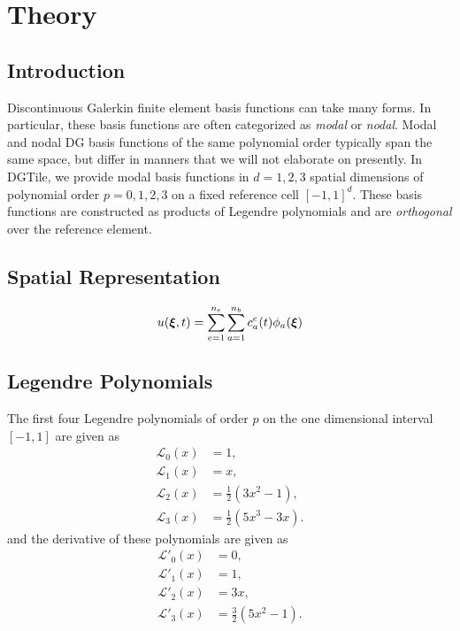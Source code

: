 \section{Theory}

\subsection{Introduction}

Discontinuous Galerkin finite element basis functions can take many forms.
In particular, these basis functions are often categorized as \emph{modal}
or \emph{nodal}. Modal and nodal DG basis functions of the same polynomial
order typically span the same space, but differ in manners that we will not
elaborate on presently. In DGTile, we provide modal basis functions in
$d=1,2,3$ spatial dimensions of polynomial order $p=0,1,2,3$ on a fixed
reference cell $[-1,1]^d$. These basis functions are constructed as products
of Legendre polynomials and are \emph{orthogonal} over the reference element.

\subsection{Spatial Representation}

\begin{equation}
u(\boldsymbol{\xi}, t) = \sum_{e=1}^{n_e} \sum_{a=1}^{n_b} c_a^e(t) \phi_a(\boldsymbol{\xi})
\end{equation}

\subsection{Legendre Polynomials}

The first four Legendre polynomials of order $p$ on the one dimensional
interval $[-1,1]$ are given as
%
\begin{equation}
\begin{aligned}
\mathcal{L}_0(x) &= 1, \\
\mathcal{L}_1(x) &= x, \\
\mathcal{L}_2(x) &= \frac12 (3x^2-1), \\
\mathcal{L}_3(x) &= \frac12 (5x^3-3x).
\end{aligned}
\label{eq:legendre_polynomials}
\end{equation}
%
and the derivative of these polynomials are given as
%
\begin{equation}
\begin{aligned}
\mathcal{L}'_0(x) &= 0, \\
\mathcal{L}'_1(x) &= 1, \\
\mathcal{L}'_2(x) &= 3x, \\
\mathcal{L}'_3(x) &= \frac32(5x^2-1).
\end{aligned}
\label{eq:legendre_polynomial_derivatives}
\end{equation}


